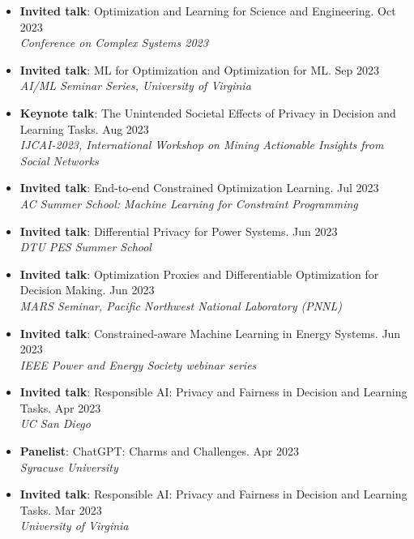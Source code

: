 \begin{itemize}
  \item {\bf Invited talk}: {Optimization and Learning for Science and Engineering.} \hfill{Oct 2023}\\
  {\em  Conference on Complex Systems 2023}

  \item {\bf Invited talk}: {ML for Optimization and Optimization for ML.} \hfill{Sep 2023}\\
  {\em  AI/ML Seminar Series, University of Virginia}

  \item {\bf Keynote talk}: {The Unintended Societal Effects of Privacy in Decision and Learning Tasks.} \hfill{Aug 2023}\\
  {\em  IJCAI-2023, International Workshop on Mining Actionable Insights from Social Networks}

  \item {\bf Invited talk}: {End-to-end Constrained Optimization Learning.} \hfill{Jul 2023}\\
  {\em  AC Summer School: Machine Learning for Constraint Programming}

  \item {\bf Invited talk}: {Differential Privacy for Power Systems.} \hfill{Jun 2023}\\
  {\em  DTU PES Summer School}

  \item {\bf Invited talk}: {Optimization Proxies and Differentiable Optimization for Decision Making.} \hfill{Jun 2023}\\
  {\em  MARS Seminar, Pacific Northwest National Laboratory (PNNL)}

  \item {\bf Invited talk}: {Constrained-aware Machine Learning in Energy Systems.} \hfill{Jun 2023}\\
  {\em  IEEE Power and Energy Society webinar series}

  \item {\bf Invited talk}: {Responsible AI: Privacy and Fairness in Decision and Learning Tasks.} \hfill{Apr 2023}\\
  {\em  UC San Diego}

  \item {\bf Panelist}: {ChatGPT: Charms and Challenges.} \hfill{Apr 2023}\\
  {\em  Syracuse University}

  \item {\bf Invited talk}: {Responsible AI: Privacy and Fairness in Decision and Learning Tasks.} \hfill{Mar 2023}\\
  {\em  University of Virginia}


\end{itemize}
